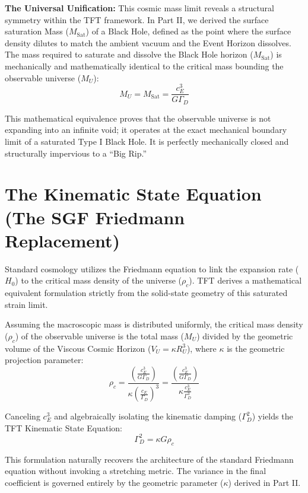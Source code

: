 \textbf{The Universal Unification:} This cosmic mass limit reveals a structural symmetry within the TFT framework. In Part II, we derived the surface saturation Mass ($M_{\text{Sat}}$) of a Black Hole, defined as the point where the surface density dilutes to match the ambient vacuum and the Event Horizon dissolves. The mass required to saturate and dissolve the Black Hole horizon ($M_{\text{Sat}}$) is mechanically and mathematically identical to the critical mass bounding the observable universe ($M_U$):
\begin{equation}
    M_U = M_{\text{Sat}} = \frac{c_E^3}{G \Gamma_D}
\end{equation}

This mathematical equivalence proves that the observable universe is not expanding into an infinite void; it operates at the exact mechanical boundary limit of a saturated Type I Black Hole. It is perfectly mechanically closed and structurally impervious to a ``Big Rip.''

\section{The Kinematic State Equation (The SGF Friedmann Replacement)}
Standard cosmology utilizes the Friedmann equation to link the expansion rate ($H_0$) to the critical mass density of the universe ($\rho_c$). TFT derives a mathematical equivalent formulation strictly from the solid-state geometry of this saturated strain limit.

Assuming the macroscopic mass is distributed uniformly, the critical mass density ($\rho_c$) of the observable universe is the total mass ($M_U$) divided by the geometric volume of the Viscous Cosmic Horizon ($V_U = \kappa R_U^3$), where $\kappa$ is the geometric projection parameter:
\begin{equation}
    \rho_c = \frac{\left( \frac{c_E^3}{G \Gamma_D} \right)}{\kappa \left( \frac{c_E}{\Gamma_D} \right)^3} = \frac{\left( \frac{c_E^3}{G \Gamma_D} \right)}{\kappa \frac{c_E^3}{\Gamma_D^3}}
\end{equation}

Canceling $c_E^3$ and algebraically isolating the kinematic damping ($\Gamma_D^2$) yields the TFT Kinematic State Equation:
\begin{equation}
    \Gamma_D^2 = \kappa G \rho_c
\end{equation}

This formulation naturally recovers the architecture of the standard Friedmann equation without invoking a stretching metric. The variance in the final coefficient is governed entirely by the geometric parameter ($\kappa$) derived in Part II.

